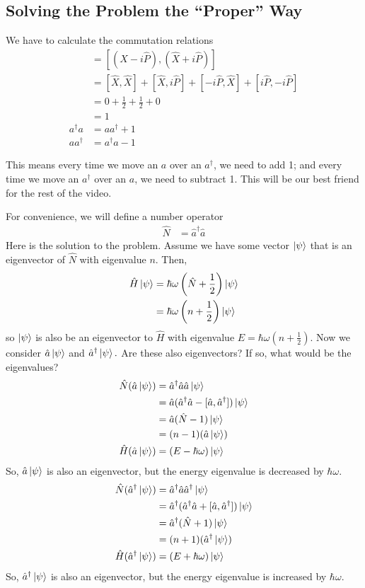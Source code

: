 \subsection{Solving the Problem the ``Proper'' Way}
We have to calculate the commutation relations
\begin{align}
    [\hat a,\hat a^\dagger]&=[(\hat X-i\hat P),(\hat X+i\hat P)]\\
    &=[\hat X, \hat X]+[\hat X,i\hat P]+[-i\hat P,\hat X]+[i\hat P,-i\hat P]\\
    &=0+\frac{1}{2}+\frac{1}{2}+0\\
    &=1\\
    a^\dagger a&=aa^\dagger+1\\
    aa^\dagger&=a^\dagger a-1
\end{align}
\begin{script}
    This means every time we move an \(a\) over an \(a^\dagger\), we need to add 1; and every time we move an \(a^\dagger\) over an \(a\), we need to subtract 1. This will be our best friend for the rest of the video. 
\end{script}
For convenience, we will define a number operator
\begin{align}
    \hat N &= \hat a^\dagger\hat a
\end{align}
Here is the solution to the problem. Assume we have some vector \(\ket\psi\) that is an eigenvector of \(\hat N\) with eigenvalue \(n.\) Then, 
\begin{align}
    \hat H\ket\psi&=\hbar\omega\left(\hat N+\frac{1}{2}\right)\ket\psi\\
    &=\hbar\omega\left(n+\frac{1}{2}\right)\ket\psi
\end{align}
so \(\ket\psi\) is also be an eigenvector to \(\hat H\) with eigenvalue \(E=\hbar\omega\left(n+\frac{1}{2}\right).\) Now we consider \(\hat a\ket\psi\) and \(\hat a^\dagger\ket\psi.\) Are these also eigenvectors? If so, what would be the eigenvalues?
\begin{align}
    \hat N(\hat a\ket\psi)&=\hat a^\dagger\hat a\hat a\ket\psi\\
    &=\hat a(\hat a^\dagger\hat a-[\hat a,\hat a^\dagger])\ket\psi\\
    &=\hat a(\hat N-1)\ket\psi\\
    &=(n-1)(\hat a\ket\psi)\\
    \hat H(\hat a\ket\psi)&=(E-\hbar\omega)\ket\psi
\end{align}
So, \(\hat a\ket\psi\) is also an eigenvector, but the energy eigenvalue is decreased by \(\hbar\omega.\)
\begin{align}
    \hat N(\hat a^\dagger\ket\psi)&=\hat a^\dagger\hat a\hat a^\dagger\ket\psi\\
    &=\hat a^\dagger(\hat a^\dagger\hat a+[\hat a,\hat a^\dagger])\ket\psi\\
    &=\hat a^\dagger(\hat N+1)\ket\psi\\
    &=(n+1)(\hat a^\dagger\ket\psi)\\
    \hat H(\hat a^\dagger\ket\psi)&=(E+\hbar\omega)\ket\psi
\end{align}
So, \(\hat a^\dagger\ket\psi\) is also an eigenvector, but the energy eigenvalue is increased by \(\hbar\omega.\)

